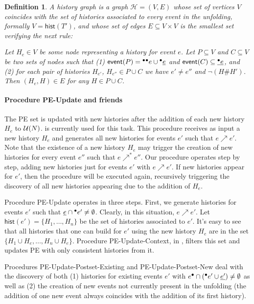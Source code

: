 \documentclass[]{article}
\newtheorem{definition}{Definition}
\newcommand{\event}[1]{\ensuremath{\mathsf{event}(#1)}}
\newcommand{\hist}[1]{\ensuremath{\mathsf{hist}(#1)}}
\newcommand{\h}{\ensuremath{\mathcal{H}}}
\newcommand{\pe}{{\sc PE}}
\newcommand{\peupdate}{{\sc PE-Update}}
\newcommand{\peupdatecont}{{\sc PE-Update-Context}}
\newcommand{\peupdatepostexisting}{{\sc PE-Update-Postset-Existing}}
\newcommand{\peupdatepostnew}{{\sc PE-Update-Postset-New}}
\begin{document}
\begin{definition}

A \emph{history graph} is a graph $\h = (V, E)$ whose set of vertices
$V$ coincides with the set of histories associated to every event in the
unfolding, formally $V = \hist{T'}$, and whose set of edges $E \subseteq V
\times V$ is the smallest set verifying the next rule:

Let $H_e \in V$ be some node representing a history for event $e$.  Let $P
\subseteq V$ and $C \subseteq V$ be two sets of nodes such that (1) $\event{P}
= \pre{\pre{e}} \cup \pre{\cont{e}}$ and $\event{C} \subseteq \cont{\pre{e}}$,
and (2) for each pair of histories $H_{e'}$, $H_{e''} \in P \cup C$ we have $e'
\neq e''$ and $\neg (H \# H')$.  Then $(H_e, H) \in E$ for any $H \in P \cup
C$.

\end{definition}

\paragraph{Procedure \peupdate{} and friends} The \pe{} set is updated with new
histories after the addition of each new history $H_e$ to $\mathcal{U}(N)$.
 is currently used for this task.  This procedure receives as
input a new history $H_e$ and generates all new histories for events $e'$ such
that $e \nearrow e'$.  Note that the existence of a new history $H_e$ may
trigger the creation of new histories for every event $e''$ such that $e
\nearrow^* e''$.  Our procedure operates step by step, adding new histories
just for events $e'$ with $e \nearrow e'$.  If new histories appear for $e'$,
then the procedure will be executed again, recursively triggering the discovery
of all new histories appearing due to the addition of $H_e$.

Procedure \peupdate{} operates in three steps.  First, we generate histories
for events $e'$ such that $\underline{e} \cap {}^\bullet e' \neq \emptyset$.  Clearly, in
this situation, $e \nearrow e'$.  Let $\hist{e'} = \{H_1, \ldots, H_n\}$ be the
set of histories associated to $e'$.  It's easy to see that all histories that
one can build for $e'$ using the new history $H_e$ are in the set $\{H_1
\cup H_e, \ldots, H_n \cup H_e\}$.  Procedure \peupdatecont{}, in
, filters this set and updates \pe{} with only consistent
histories from it.

Procedures \peupdatepostexisting{} and \peupdatepostnew{} deal with the
discovery of both (1) histories for existing events $e'$ with $e^\bullet \cap
({}^\bullet e' \cup \underline{e'}) \neq \emptyset$ as well as (2) the creation of new
events not currently present in the unfolding (the addition of one new event
always coincides with the addition of its first history).
\end{document}
